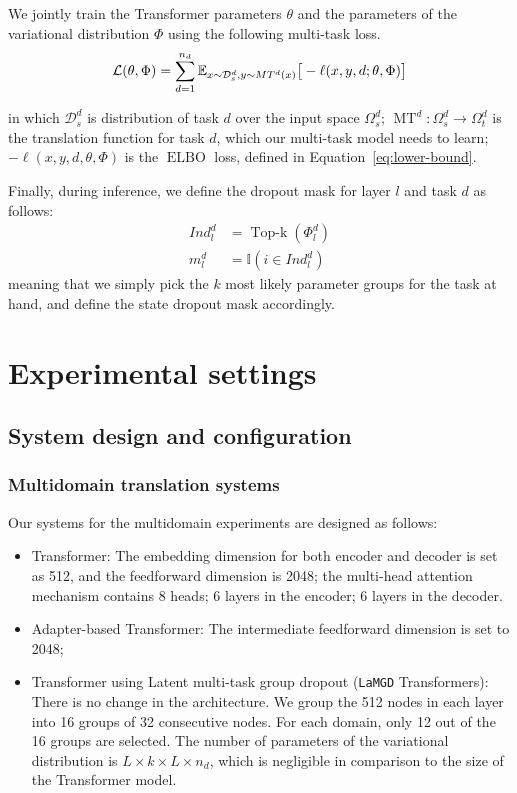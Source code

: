 \documentclass[11pt]{article}
\newcommand{\fyDone}[1]{\done[FY]\Todo[FY:]{\textcolor{orange}{#1}}}
\newcommand{\system}[1]{\texttt{{#1}}}
\begin{document}
We jointly train the Transformer parameters $\theta$ and the parameters of the variational distribution $\Phi$ using the following multi-task loss.\fyDone{This is repeated}
\begin{align}
\hspace{-0.em}
\mathcal{L}(\theta,\Phi) = \sum_{d=1}^{n_d} \mathbb{E}_{x \sim \mathcal{D}_s^d,y \sim MT^d(x)} \big[-\ell(x,y,d; \theta,\Phi)\big]
\end{align}

in which $\mathcal{D}_s^d$ is distribution of task $d$ over the input space $\Omega^d_s$; $\operatorname{MT}^d: \Omega^d_s \rightarrow \Omega^d_t$\fyDone{already defined} is the translation function for task $d$, which our multi-task model needs to learn; $-\ell(x,y, d, \theta,\Phi)$ is the $\operatorname{ELBO}$ loss, defined in Equation~\ref{eq:lower-bound}.

Finally, during inference, we define the dropout mask for layer $l$ and task $d$ as follows:
\begin{align*}
  Ind_l^d &= \operatorname{Top-k}(\Phi_l^d) \\
  m_l^d &= \mathbb{I}(i\in Ind_l^d)
\end{align*}
meaning that we simply pick the $k$ most likely parameter groups for the task at hand, and define the state dropout mask accordingly.

\section{Experimental settings \label{sec:experiments}}

\subsection{System design and configuration}
\subsubsection{Multidomain translation systems}
Our systems for the multidomain experiments are designed as follows:
\begin{itemize}
\item Transformer: The embedding dimension for both encoder and decoder is set as 512, and the feedforward dimension is 2048; the multi-head attention mechanism contains 8 heads; 6 layers in the encoder; 6 layers in the decoder.\fyDone{How many layers}
\item Adapter-based Transformer: The intermediate feedforward dimension is set to 2048;%
\item Transformer using Latent multi-task group dropout (\system{LaMGD} Transformers):\fyDone{Explain acronym} There is no change in the architecture. We group the 512 nodes in each layer into 16 groups of 32 consecutive nodes. For each domain, only 12 out of the 16 groups are selected. The number of parameters of the variational distribution is $L\times k \times L \times n_d$, which is negligible in comparison to the size of the Transformer model.
\end{itemize}
\end{document}
